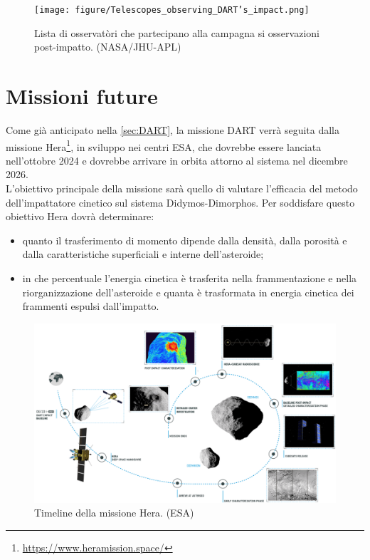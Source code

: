 \documentclass[a4paper,11pt,openright]{book}
\begin{document}
\begin{figure}[!h]
    \centering
    \texttt{[image: figure/Telescopes\_observing\_DART's\_impact.png]}
    \caption[Osservatòri che hanno osservato l'impatto di DART.]{Lista di osservatòri che partecipano alla campagna si osservazioni post-impatto. (NASA/JHU-APL)}
    \label{fig:obs_dart}
\end{figure}

\section{Missioni future}\label{sec:hera}
Come già anticipato nella \cref{sec:DART}, la missione DART verrà seguita dalla missione Hera\footnote{\href{https://www.heramission.space/}{https://www.heramission.space/}}, in sviluppo nei centri ESA, che dovrebbe essere lanciata nell'ottobre 2024 e dovrebbe arrivare in orbita attorno al sistema nel dicembre 2026.\\
L'obiettivo principale della missione sarà quello di valutare l'efficacia del metodo dell'impattatore cinetico sul sistema Didymos-Dimorphos. Per soddisfare questo obiettivo Hera dovrà determinare: 
\begin{itemize}
    \item quanto il trasferimento di momento dipende dalla densità, dalla porosità e dalla caratteristiche superficiali e interne dell'asteroide;
    \item in che percentuale l'energia cinetica è trasferita nella frammentazione e nella riorganizzazione dell'asteroide e quanta è trasformata in energia cinetica dei frammenti espulsi dall'impatto.
\end{itemize}

\begin{figure}[!h]
    \centering
    \includegraphics[scale=0.50]{figure/Hera_mission_timeline.png}
    \caption[Timeline della missione Hera.]{Timeline della missione Hera. (ESA)}
    \label{fig:hera_timeline}
\end{figure}
\end{document}
